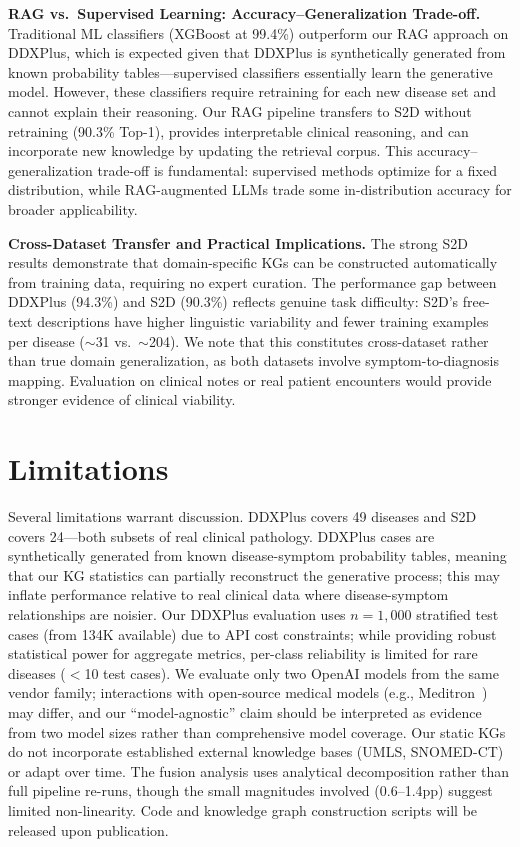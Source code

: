 \documentclass[runningheads]{llncs}
\begin{document}
\textbf{RAG vs.\ Supervised Learning: Accuracy--Generalization Trade-off.}
Traditional ML classifiers (XGBoost at 99.4\%) outperform our RAG approach on DDXPlus, which is expected given that DDXPlus is synthetically generated from known probability tables---supervised classifiers essentially learn the generative model. However, these classifiers require retraining for each new disease set and cannot explain their reasoning. Our RAG pipeline transfers to S2D without retraining (90.3\% Top-1), provides interpretable clinical reasoning, and can incorporate new knowledge by updating the retrieval corpus. This accuracy--generalization trade-off is fundamental: supervised methods optimize for a fixed distribution, while RAG-augmented LLMs trade some in-distribution accuracy for broader applicability.

\textbf{Cross-Dataset Transfer and Practical Implications.}
The strong S2D results demonstrate that domain-specific KGs can be constructed automatically from training data, requiring no expert curation. The performance gap between DDXPlus (94.3\%) and S2D (90.3\%) reflects genuine task difficulty: S2D's free-text descriptions have higher linguistic variability and fewer training examples per disease (${\sim}$31 vs.\ ${\sim}$204). We note that this constitutes cross-dataset rather than true domain generalization, as both datasets involve symptom-to-diagnosis mapping. Evaluation on clinical notes or real patient encounters would provide stronger evidence of clinical viability.

\section{Limitations}
\label{sec:limitations}

Several limitations warrant discussion. DDXPlus covers 49 diseases and S2D covers 24---both subsets of real clinical pathology. DDXPlus cases are synthetically generated from known disease-symptom probability tables, meaning that our KG statistics can partially reconstruct the generative process; this may inflate performance relative to real clinical data where disease-symptom relationships are noisier. Our DDXPlus evaluation uses $n{=}1{,}000$ stratified test cases (from 134K available) due to API cost constraints; while providing robust statistical power for aggregate metrics, per-class reliability is limited for rare diseases ($<$10 test cases). We evaluate only two OpenAI models from the same vendor family; interactions with open-source medical models (e.g., Meditron~\cite{chen2023meditron}) may differ, and our ``model-agnostic'' claim should be interpreted as evidence from two model sizes rather than comprehensive model coverage. Our static KGs do not incorporate established external knowledge bases (UMLS, SNOMED-CT) or adapt over time. The fusion analysis uses analytical decomposition rather than full pipeline re-runs, though the small magnitudes involved (0.6--1.4pp) suggest limited non-linearity. Code and knowledge graph construction scripts will be released upon publication.
\end{document}
